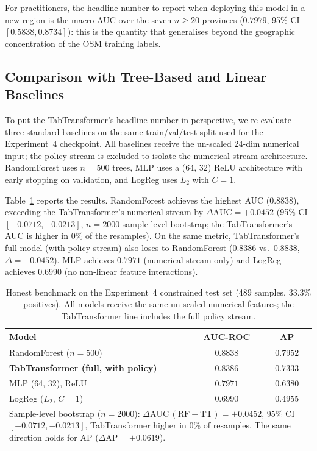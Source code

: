 \documentclass[12pt, a4paper]{article}
\begin{document}
For practitioners, the headline number to report when
deploying this model in a new region is the macro-AUC over the
seven $n\geq 20$ provinces ($0.7979$, 95\% CI $[0.5838,
0.8734]$): this is the quantity that generalises beyond the
geographic concentration of the OSM training labels.

\subsection{Comparison with Tree-Based and Linear Baselines}
\label{sec:baselines}

To put the TabTransformer's headline number in perspective, we
re-evaluate three standard baselines on the same train/val/test
split used for the Experiment~4 checkpoint. All baselines
receive the un-scaled 24-dim numerical input; the policy stream
is excluded to isolate the numerical-stream architecture.
RandomForest uses $n=500$ trees, MLP uses a (64, 32) ReLU
architecture with early stopping on validation, and LogReg uses
$L_2$ with $C=1$.

\begin{sloppypar}
Table~\ref{tab:baselines} reports the results. RandomForest
achieves the highest AUC ($0.8838$), exceeding the
TabTransformer's numerical stream by $\Delta\text{AUC}=+0.0452$
(95\% CI $[-0.0712, -0.0213]$, $n=2000$ sample-level
bootstrap; the TabTransformer's AUC is higher in $0\%$ of the
resamples). On the same metric, TabTransformer's full model
(with policy stream) also loses to RandomForest
($0.8386$ vs.\ $0.8838$, $\Delta=-0.0452$). MLP achieves
$0.7971$ (numerical stream only) and LogReg achieves
$0.6990$ (no non-linear feature interactions).
\end{sloppypar}

\begin{table}[H]
\centering
\caption{Honest benchmark on the Experiment~4 constrained test
set (489 samples, 33.3\% positives). All models receive the
same un-scaled numerical features; the TabTransformer line
includes the full policy stream.}
\label{tab:baselines}
\small
\begin{tabular}{lcc}
\toprule
\textbf{Model} & \textbf{AUC-ROC} & \textbf{AP} \\
\midrule
RandomForest ($n=500$)                   & $\mathbf{0.8838}$ & $\mathbf{0.7952}$ \\
\textbf{TabTransformer (full, with policy)} & $\mathbf{0.8386}$ & $\mathbf{0.7333}$ \\
MLP (64, 32), ReLU                       & $0.7971$ & $0.6380$ \\
LogReg ($L_2$, $C=1$)                    & $0.6990$ & $0.4955$ \\
\bottomrule
\multicolumn{3}{p{0.85\textwidth}}{\small
  Sample-level bootstrap ($n=2000$):
  $\Delta\text{AUC}\,(\text{RF}-\text{TT})=+0.0452$,
  95\% CI $[-0.0712, -0.0213]$, TabTransformer higher in
  $0\%$ of resamples. The same direction holds for AP
  ($\Delta\text{AP}=+0.0619$).} \\
\end{tabular}
\end{table}
\end{document}
